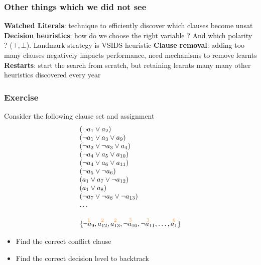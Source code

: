\begin{frame}
  \frametitle{Other things which we did not see}

  {\bf Watched Literals}: technique to efficiently discover which clauses
                          become unsat
  \vfill
  {\bf Decision heuristics}: how do we choose the right variable ?
  And which polarity ? ($\top, \bot$). Landmark strategy is VSIDS heuristic
  \vfill
  {\bf Clause removal}: adding too many clauses negatively impacts 
			performance, need mechanisms to remove learnts
  \vfill
  {\bf Restarts}: start the search from scratch, but retaining learnts
  \vfill
  many many other heuristics discovered every year

\end{frame}

\begin{frame}
  \frametitle{Exercise}

  \scriptsize

  Consider the following clause set and assignment
  $$
  \begin{array}{l}
  (\neg a_1 \vee a_2) \\
  (\neg a_1 \vee a_3 \vee a_9) \\
  (\neg a_2 \vee \neg a_3 \vee a_4) \\
  (\neg a_4 \vee a_5 \vee a_{10}) \\
  (\neg a_4 \vee a_6 \vee a_{11}) \\
  (\neg a_5 \vee \neg a_6) \\
  (a_1 \vee a_7 \vee \neg a_{12}) \\
  (a_1 \vee a_8) \\
  (\neg a_7 \vee \neg a_8 \vee \neg a_{13}) \\
  \ldots \\ \\
  \{ \dec{\neg a_9}{1}, \dec{a_{12}}{2}, \dec{a_{13}}{2}, \dec{\neg a_{10}}{3}, \dec{\neg a_{11}}{3}, \ldots, \dec{a_1}{6}\}
  \end{array}
  $$
  \vfill
  \begin{itemize}
    \item Find the correct conflict clause
    \item Find the correct decision level to backtrack
  \end{itemize}

\end{frame}
